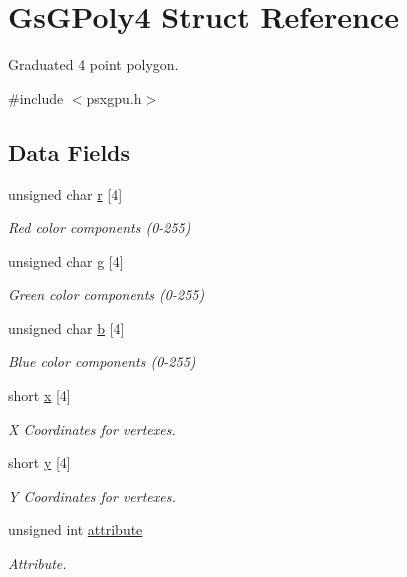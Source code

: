 \hypertarget{structGsGPoly4}{}\section{Gs\+G\+Poly4 Struct Reference}
\label{structGsGPoly4}


Graduated 4 point polygon.  




{\ttfamily \#include $<$psxgpu.\+h$>$}

\subsection*{Data Fields}
\begin{DoxyCompactItemize}
\item 
unsigned char \hyperlink{structGsGPoly4_ad1bcb72c4a381b75479a7d272078e7ce}{r} \mbox{[}4\mbox{]}
\begin{DoxyCompactList}\small\item\em Red color components (0-\/255) \end{DoxyCompactList}\item 
unsigned char \hyperlink{structGsGPoly4_abb1a69f0f5846b10c77ccc5cc61ae909}{g} \mbox{[}4\mbox{]}
\begin{DoxyCompactList}\small\item\em Green color components (0-\/255) \end{DoxyCompactList}\item 
unsigned char \hyperlink{structGsGPoly4_a35675523985a715e01f86b1f0dfe908c}{b} \mbox{[}4\mbox{]}
\begin{DoxyCompactList}\small\item\em Blue color components (0-\/255) \end{DoxyCompactList}\item 
short \hyperlink{structGsGPoly4_a90f4eabdef6d4b712a9a93d1b2a2d30c}{x} \mbox{[}4\mbox{]}
\begin{DoxyCompactList}\small\item\em X Coordinates for vertexes. \end{DoxyCompactList}\item 
short \hyperlink{structGsGPoly4_a7c1e7cdef1183cdcf81f8293446fd9f4}{y} \mbox{[}4\mbox{]}
\begin{DoxyCompactList}\small\item\em Y Coordinates for vertexes. \end{DoxyCompactList}\item 
unsigned int \hyperlink{structGsGPoly4_af5e7a061fb2b0a57972442dcf2f78bce}{attribute}
\begin{DoxyCompactList}\small\item\em Attribute. \end{DoxyCompactList}\end{DoxyCompactItemize}


